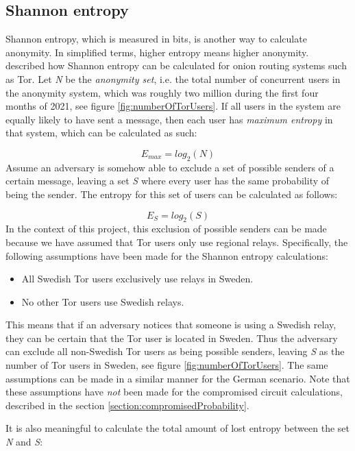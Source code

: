 \documentclass{kththesis}
\begin{document}
\subsection{Shannon entropy}
\label{section:shannonentropy}
Shannon entropy, which is measured in bits, is another way to calculate anonymity. In simplified terms, higher entropy means higher anonymity. \textcite{diaz2002towards} described how Shannon entropy can be calculated for onion routing systems such as Tor. Let \emph{N} be the \emph{anonymity set}, i.e. the total number of concurrent users in the anonymity system, which was roughly two million during the first four months of 2021, see figure \ref{fig:numberOfTorUsers}. If all users in the system are equally likely to have sent a message, then each user has \emph{maximum entropy} in that system, which can be calculated as such:

\[E_{max} = log_{2}(N)\]
Assume an adversary is somehow able to exclude a set of possible senders of a certain message, leaving a set \emph{S} where every user has the same probability of being the sender. The entropy for this set of users can be calculated as follows:

\[E_{S} = log_{2}(S)\]
In the context of this project, this exclusion of possible senders can be made because we have assumed that Tor users only use regional relays. Specifically, the following assumptions have been made for the Shannon entropy calculations:

\begin{itemize}
  \vspace{-0.2cm}\item All Swedish Tor users exclusively use relays in Sweden.
  \vspace{-0.2cm}\item No other Tor users use Swedish relays.
\end{itemize}

This means that if an adversary notices that someone is using a Swedish relay, they can be certain that the Tor user is located in Sweden. Thus the adversary can exclude all non-Swedish Tor users as being possible senders, leaving \emph{S} as the number of Tor users in Sweden, see figure \ref{fig:numberOfTorUsers}. The same assumptions can be made in a similar manner for the German scenario. Note that these assumptions have \emph{not} been made for the compromised circuit calculations, described in the section \ref{section:compromisedProbability}.

It is also meaningful to calculate the total amount of lost entropy between the set \emph{N} and \emph{S}:
\end{document}
